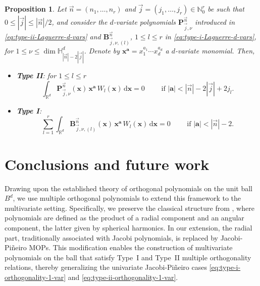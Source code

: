 \documentclass[a4paper]{article}
\theoremstyle{plain}
\newtheorem{proposition}[theorem]{Proposition}
\theoremstyle{definition}
\newcommand{\NN}{\mathbb{N}}
\newcommand{\dr}{\mathrm{d}}
\begin{document}
    \begin{proposition}
        Let $\vec n = (n_1,\dots,n_r)$ and $\vec j = (j_1,\dots,j_r)\in\NN_0^r$ be such that  $0\leq |\vec j| \leq |\vec n|/2$, and consider the $d$-variate polynomials $\mathbf P^{\vec n}_{\vec j,\nu}$ introduced in \eqref{eq:type-ii-Laguerre-d-vars} and $\mathbf B^{\vec n}_{\vec j,\nu,(l)}$, $1\leq l\leq r$ in \eqref{eq:type-i-Laguerre-d-vars}, for $1\leq \nu\leq \dim\mathbb H_{|\vec n|-2|\vec j|}^d$. Denote by $\mathbf x^{\mathbf a}=x_1^{a_1}\cdots x_d^{a_d}$ a $d$-variate monomial. Then,
        \begin{itemize}
            \item \textbf{Type II}: for  $1\leq l \leq r$
            \begin{equation}
            \int_{\mathbb R^d} \mathbf P^{\vec n}_{\vec j,\nu}(\mathbf x)\, \mathbf x^{\mathbf a}\, W_l(\mathbf x)\, \dr\mathbf x = 0 \qquad\text{ if } |\mathbf a|<|\vec n|-2|\vec j|+2j_l.
            \end{equation}
            
            \item \textbf{Type I}:
            \begin{equation}
            \sum_{l=1}^r\int_{\mathbb R^d} \mathbf B^{\vec n}_{\vec j,\nu,(l)}(\mathbf x)\, \mathbf x^{\mathbf a}\, W_l(\mathbf x)\, \dr\mathbf x = 0 \qquad\text{ if } |\mathbf a|<|\vec n|-2.
            \end{equation}
            \end{itemize}
    \end{proposition}
    
    

    \section{Conclusions and future work}

    Drawing upon the established theory of orthogonal polynomials on the unit ball $B^d$, we use multiple orthogonal polynomials to extend this framework to the multivariate setting. Specifically, we preserve the classical structure from \cite{DX14}, where polynomials are defined as the product of a radial component and an angular component, the latter given by spherical harmonics. In our extension, the radial part, traditionally associated with Jacobi polynomials, is replaced by Jacobi-Pi\~neiro MOPs. This modification enables the construction of multivariate polynomials on the ball that satisfy Type~I and Type~II multiple orthogonality relations, thereby generalizing the univariate Jacobi-Pi\~neiro cases \eqref{eq:type-i-orthogonality-1-var} and \eqref{eq:type-ii-orthogonality-1-var}. 
    
\end{document}
